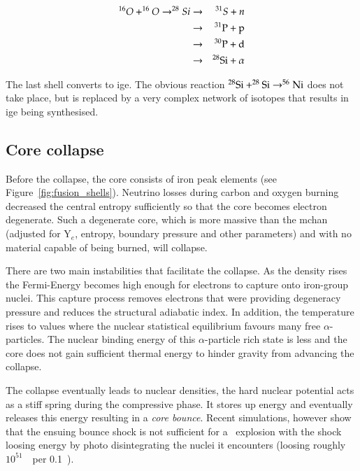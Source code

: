 \begin{eqnarray}
^{16}O+^{16}O\rightarrow^{28}Si&\rightarrow&^{31}S+n \nonumber \\
	&\rightarrow&\nucl{P}{31} + \textrm{p} \nonumber \\
	&\rightarrow&\nucl{P}{30} + \textrm{d} \nonumber \\
	&\rightarrow&\nucl{Si}{28} + \alpha \nonumber \\
	\label{eqn:o_burning}
\end{eqnarray}

The last shell converts  to \gls{ige}. The obvious reaction $\nucl{Si}{28}+\nucl{Si}{28}\rightarrow\nucl{Ni}{56}$ does not take place, but is replaced by a very complex network of isotopes that results in \gls{ige} being synthesised.

\subsection{Core collapse}

Before the collapse,  the core consists of iron peak elements (see Figure~\ref{fig:fusion_shells}). Neutrino losses during carbon and oxygen burning decreased the central entropy sufficiently so that the core becomes electron degenerate. Such a degenerate core, which is more massive than the \gls{mchan} (adjusted for Y$_e$, entropy, boundary pressure and other parameters) and with no material capable of being burned, will collapse. 

There are two main instabilities that facilitate the collapse. As the density rises the Fermi-Energy becomes high enough for electrons to capture onto iron-group nuclei. This capture process removes electrons that were providing degeneracy pressure and reduces the structural adiabatic index. In addition, the temperature rises to values where the nuclear statistical equilibrium favours many free $\alpha$-particles. The nuclear binding energy of this  $\alpha$-particle rich state is less and the core does not gain sufficient thermal energy to hinder gravity from advancing the collapse.

The collapse eventually leads to nuclear densities, the hard nuclear potential acts as a stiff spring during the compressive phase. It stores up energy and eventually releases this energy resulting in a \textit{core bounce}.  Recent simulations, however show that the ensuing bounce shock is not sufficient for a \snii\ explosion with the shock loosing energy by photo disintegrating the nuclei it encounters (loosing roughly $10^{51}$~\erg\ per 0.1~\msun).

